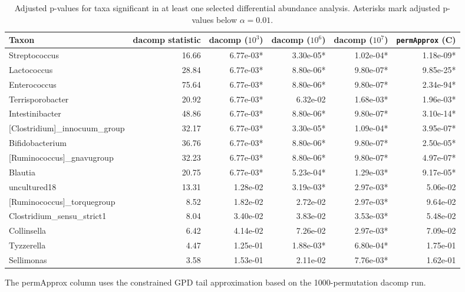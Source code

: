 \begin{table}[!h]
\centering
\caption{\label{tab:application:diff-abundance-adjusted-pvalues}Adjusted p-values for taxa significant in at least one selected differential abundance analysis. Asterisks mark adjusted p-values below $\alpha = 0.01$.}
\centering
\begin{threeparttable}
\begin{tabular}[t]{lrrrrr}
\toprule
Taxon & dacomp statistic & dacomp ($10^3$) & dacomp ($10^6$) & dacomp ($10^7$) & \texttt{permApprox} (C)\\
\midrule
Streptococcus & 16.66 & 6.77e-03* & 3.30e-05* & 1.02e-04* & 1.18e-09*\\
Lactococcus & 28.84 & 6.77e-03* & 8.80e-06* & 9.80e-07* & 9.85e-25*\\
Enterococcus & 75.64 & 6.77e-03* & 8.80e-06* & 9.80e-07* & 2.34e-94*\\
Terrisporobacter & 20.92 & 6.77e-03* & 6.32e-02 & 1.68e-03* & 1.96e-03*\\
Intestinibacter & 48.86 & 6.77e-03* & 8.80e-06* & 9.80e-07* & 3.10e-14*\\
\addlinespace
{}[Clostridium]_innocuum_group & 32.17 & 6.77e-03* & 3.30e-05* & 1.09e-04* & 3.95e-07*\\
Bifidobacterium & 36.76 & 6.77e-03* & 8.80e-06* & 9.80e-07* & 2.50e-05*\\
{}[Ruminococcus]_gnavugroup & 32.23 & 6.77e-03* & 8.80e-06* & 9.80e-07* & 4.97e-07*\\
Blautia & 20.75 & 6.77e-03* & 5.23e-04* & 1.29e-03* & 9.17e-05*\\
uncultured18 & 13.31 & 1.28e-02 & 3.19e-03* & 2.97e-03* & 5.06e-02\\
\addlinespace
{}[Ruminococcus]_torquegroup & 8.52 & 1.82e-02 & 2.72e-02 & 2.97e-03* & 9.64e-02\\
Clostridium_sensu_strict1 & 8.04 & 3.40e-02 & 3.83e-02 & 3.53e-03* & 5.48e-02\\
Collinsella & 6.42 & 4.14e-02 & 7.26e-02 & 2.97e-03* & 7.09e-02\\
Tyzzerella & 4.47 & 1.25e-01 & 1.88e-03* & 6.80e-04* & 1.75e-01\\
Sellimonas & 3.58 & 1.53e-01 & 2.11e-02 & 7.76e-03* & 1.62e-01\\
\bottomrule
\end{tabular}
\begin{tablenotes}
\item The permApprox column uses the constrained GPD tail approximation based on the 1000-permutation dacomp run.
\end{tablenotes}
\end{threeparttable}
\end{table}

